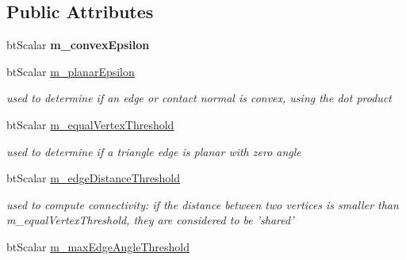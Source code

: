 \subsection*{Public Attributes}
\begin{DoxyCompactItemize}
\item 
\hypertarget{structbt_triangle_info_map_ac471ee4ba8b753d2f8298fad2bdcda5e}{bt\+Scalar {\bfseries m\+\_\+convex\+Epsilon}}\label{structbt_triangle_info_map_ac471ee4ba8b753d2f8298fad2bdcda5e}

\item 
\hypertarget{structbt_triangle_info_map_a7516c96369cd0eef22286b7e5ad537e8}{bt\+Scalar \hyperlink{structbt_triangle_info_map_a7516c96369cd0eef22286b7e5ad537e8}{m\+\_\+planar\+Epsilon}}\label{structbt_triangle_info_map_a7516c96369cd0eef22286b7e5ad537e8}

\begin{DoxyCompactList}\small\item\em used to determine if an edge or contact normal is convex, using the dot product \end{DoxyCompactList}\item 
\hypertarget{structbt_triangle_info_map_aa980d33e5be082442a128f0ba2efb064}{bt\+Scalar \hyperlink{structbt_triangle_info_map_aa980d33e5be082442a128f0ba2efb064}{m\+\_\+equal\+Vertex\+Threshold}}\label{structbt_triangle_info_map_aa980d33e5be082442a128f0ba2efb064}

\begin{DoxyCompactList}\small\item\em used to determine if a triangle edge is planar with zero angle \end{DoxyCompactList}\item 
\hypertarget{structbt_triangle_info_map_a521c0769aefc5c02b8394f924127dfc5}{bt\+Scalar \hyperlink{structbt_triangle_info_map_a521c0769aefc5c02b8394f924127dfc5}{m\+\_\+edge\+Distance\+Threshold}}\label{structbt_triangle_info_map_a521c0769aefc5c02b8394f924127dfc5}

\begin{DoxyCompactList}\small\item\em used to compute connectivity\+: if the distance between two vertices is smaller than m\+\_\+equal\+Vertex\+Threshold, they are considered to be 'shared' \end{DoxyCompactList}\item 
\hypertarget{structbt_triangle_info_map_a3fca61db63fe0db431044d0eba95107a}{bt\+Scalar \hyperlink{structbt_triangle_info_map_a3fca61db63fe0db431044d0eba95107a}{m\+\_\+max\+Edge\+Angle\+Threshold}}\label{structbt_triangle_info_map_a3fca61db63fe0db431044d0eba95107a}


\end{DoxyCompactItemize}
